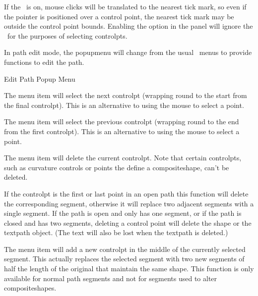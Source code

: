 If the \gridlock\ is on, mouse clicks will be translated to the
nearest tick mark, so even if the pointer is positioned over a
control point, the nearest tick mark may be outside the control
point bounds. Enabling the  option in 
the  panel will ignore the \gridlock\ for the
purposes of selecting \glspl{controlpt}.


In path edit mode, the \gls{popupmenu} will change from the usual
\selectmode\ menus to provide functions to edit the \gls{path}.

 {}
 {Edit Path Popup Menu}


The  menu item will select the next \gls{controlpt}
(wrapping round to the start from the final \gls{controlpt}).
This is an alternative to using the mouse to select a point.


The  menu item will select the previous \gls{controlpt}
(wrapping round to the end from the first \gls{controlpt}).
This is an alternative to using the mouse to select a point.


The  menu item will delete the current
\gls{controlpt}. 
Note that certain \glspl{controlpt}, such as curvature controls or points
the define a \gls{compositeshape}, can't be deleted.

If the \gls{controlpt} is the first or last point in an open path
this function will delete the corresponding segment, otherwise it
will replace two adjacent segments with a single segment.  If the
path is open and only has one segment, or if the path is closed and
has two segments, deleting a control point will delete the
\gls{shape} or the \gls{textpath} object. (The text will also be lost when
the \gls{textpath} is deleted.)


The  menu item will add a new
\gls{controlpt} in the middle of the currently selected segment.
This actually replaces the selected segment with two new segments of 
half the length of the original that maintain the same shape.
This function is only available for normal path segments and not for
segments used to alter \glspl{compositeshape}.

